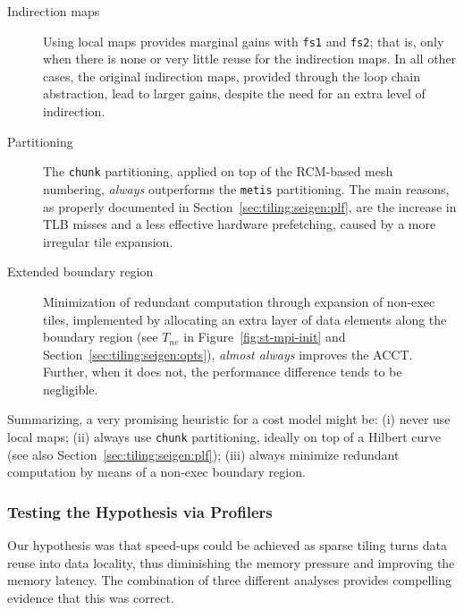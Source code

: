 \begin{description}
\item[Indirection maps] Using local maps provides marginal gains with {\tt fs1} and {\tt fs2}; that is, only when there is none or very little reuse for the indirection maps. In all other cases, the original indirection maps, provided through the loop chain abstraction, lead to larger gains, despite the need for an extra level of indirection. 
\item[Partitioning] The {\tt chunk} partitioning, applied on top of the RCM-based mesh numbering, \textit{always} outperforms the {\tt metis} partitioning. The main reasons, as properly documented in Section~\ref{sec:tiling:seigen:plf}, are the increase in TLB misses and a less effective hardware prefetching, caused by a more irregular tile expansion.
\item[Extended boundary region] Minimization of redundant computation through expansion of non-exec tiles, implemented by allocating an extra layer of data elements along the boundary region (see $T_{ne}$ in Figure~\ref{fig:st-mpi-init} and Section~\ref{sec:tiling:seigen:opts}), {\it almost always} improves the ACCT. Further, when it does not, the performance difference tends to be negligible.
\end{description}

Summarizing, a very promising heuristic for a cost model might be: (i) never use local maps; (ii) always use {\tt chunk} partitioning, ideally on top of a Hilbert curve (see also Section~\ref{sec:tiling:seigen:plf}); (iii) always minimize redundant computation by means of a non-exec boundary region.


\subsubsection{Testing the Hypothesis via Profilers}
Our hypothesis was that speed-ups could be achieved as sparse tiling turns data reuse into data locality, thus diminishing the memory pressure and improving the memory latency. The combination of three different analyses provides compelling evidence that this was correct.

